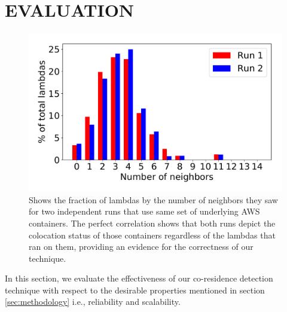 \section{EVALUATION}
\label{sec:eval}

\begin{figure}[!t]
  \includegraphics[width=.99\linewidth]{fig/correlation.pdf}
  \caption{Shows the fraction of lambdas by the number of neighbors they saw for two 
  independent runs that use same set of underlying AWS containers. The perfect correlation 
  shows that both runs depict the colocation status of those containers regardless of the 
  lambdas that ran on them, 
  providing an evidence for the correctness of our technique. 
\label{fig:correlation}}
\end{figure}

In this section, we evaluate the effectiveness of our co-residence detection 
technique with respect to the desirable properties mentioned in section \ref{sec:methodology} 
i.e., reliability and scalability. 

